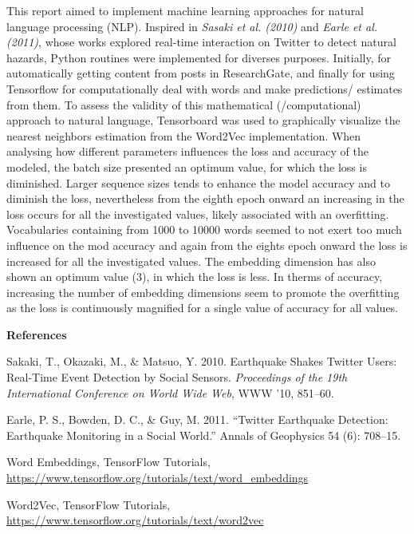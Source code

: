 \documentclass{article}
\begin{document}
This report aimed to implement machine learning approaches for natural language processing (NLP). Inspired in \textit{Sasaki et al. (2010)} and \textit{Earle et al. (2011)}, whose works explored real-time interaction on Twitter to detect natural hazards, Python routines were implemented for diverses purposes. Initially, for automatically getting content from posts in ResearchGate, and finally for using Tensorflow for computationally deal with words and make predictions/ estimates from them. To assess the validity of this mathematical (/computational) approach to natural language, Tensorboard was used to graphically visualize the nearest neighbors estimation from the Word2Vec implementation. When analysing how different parameters influences the loss and accuracy of the modeled, the batch size presented an optimum value, for which the loss is diminished. Larger sequence sizes tends to enhance the model accuracy and to diminish the loss, nevertheless from the eighth epoch onward an increasing in the loss occurs for all the investigated values, likely associated with an overfitting. Vocabularies containing from 1000 to 10000 words seemed to not exert too much influence on the mod accuracy and again from the eights epoch onward the loss is increased for all the investigated values. The embedding dimension has also shown an optimum value (3), in which the loss is less. In therms of accuracy, increasing the number of embedding dimensions seem to promote the overfitting as the loss is continuously magnified for a single value of accuracy for all values.           

\vspace*{0.5cm}


\textbf{\Large{References}}

\vspace*{0.5cm}


\noindent Sakaki, T., Okazaki, M., \& Matsuo, Y. 2010. Earthquake Shakes Twitter Users: Real-Time Event Detection by Social Sensors. \textit{Proceedings of the 19th International Conference on World Wide Web}, WWW ’10, 851–60. 

\noindent Earle, P. S., Bowden, D. C., \& Guy, M. 2011. “Twitter Earthquake Detection: Earthquake Monitoring in a Social World.” Annals of Geophysics 54 (6): 708–15.

\noindent Word Embeddings, TensorFlow Tutorials, \url{https://www.tensorflow.org/tutorials/text/word_embeddings} 

\noindent Word2Vec, TensorFlow Tutorials, \url{https://www.tensorflow.org/tutorials/text/word2vec}
\end{document}
